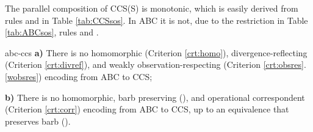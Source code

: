 \documentclass[adraft,hidelinks]{eptcs}
\begin{document}
The parallel composition of CCS(S) is monotonic, which is easily derived from rules  and  in Table \ref{tab:CCSsos}.
In ABC it is not, due to the restriction in Table \ref{tab:ABCsos}, rules  and .


\begin{proposition}{abc-ccs}
  \textbf{a)} There is no homomorphic (Criterion \ref{crt:homo}), divergence-reflecting (Criterion \ref{crt:divref}), and weakly observation-respecting (Criterion \ref{crt:obsres}.\ref{wobsres}) encoding from ABC to CCS;

  \textbf{b)} There is no homomorphic, barb preserving (), and operational correspondent (Criterion \ref{crt:corr}) encoding from ABC to CCS, up to an equivalence that preserves barb (). %


\end{proposition}
\end{document}
